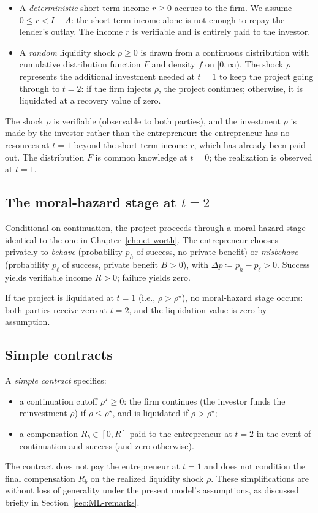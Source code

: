 \documentclass[11pt,a4paper,oneside]{book}
\def\leq{\leqslant}
\def\geq{\geqslant}
\theoremstyle{plain}
\theoremstyle{definition}
\theoremstyle{remark}
\numberwithin{equation}{chapter}
\begin{document}
\begin{itemize}
  \item A \emph{deterministic} short-term income $r \geq 0$ accrues to the firm.
  We assume $0 \leq r < I - A$: the short-term income alone is not enough to repay the lender's outlay.
  The income $r$ is verifiable and is entirely paid to the investor.
  \item A \emph{random} liquidity shock $\rho \geq 0$ is drawn from a continuous distribution with cumulative distribution function $F$ and density $f$ on $[0, \infty)$.
  The shock $\rho$ represents the additional investment needed at $t=1$ to keep the project going through to $t=2$: if the firm injects $\rho$, the project continues; otherwise, it is liquidated at a recovery value of zero.
\end{itemize}

The shock $\rho$ is verifiable (observable to both parties), and the investment $\rho$ is made by the investor rather than the entrepreneur: the entrepreneur has no resources at $t=1$ beyond the short-term income $r$, which has already been paid out.
The distribution $F$ is common knowledge at $t=0$; the realization is observed at $t=1$.

\subsection{The moral-hazard stage at $t=2$}

Conditional on continuation, the project proceeds through a moral-hazard stage identical to the one in Chapter~\ref{ch:net-worth}.
The entrepreneur chooses privately to \emph{behave} (probability $p_h$ of success, no private benefit) or \emph{misbehave} (probability $p_\ell$ of success, private benefit $B > 0$), with $\Delta p \coloneqq p_h - p_\ell > 0$.
Success yields verifiable income $R > 0$; failure yields zero.

If the project is liquidated at $t=1$ (i.e., $\rho > \rho^\star$), no moral-hazard stage occurs: both parties receive zero at $t=2$, and the liquidation value is zero by assumption.

\subsection{Simple contracts}

A \emph{simple contract} specifies:
\begin{itemize}
  \item a continuation cutoff $\rho^\star \geq 0$: the firm continues (the investor funds the reinvestment $\rho$) if $\rho \leq \rho^\star$, and is liquidated if $\rho > \rho^\star$;
  \item a compensation $R_b \in [0, R]$ paid to the entrepreneur at $t=2$ in the event of continuation and success (and zero otherwise).
\end{itemize}
The contract does not pay the entrepreneur at $t=1$ and does not condition the final compensation $R_b$ on the realized liquidity shock $\rho$.
These simplifications are without loss of generality under the present model's assumptions, as discussed briefly in Section~\ref{sec:ML-remarks}.
\end{document}

